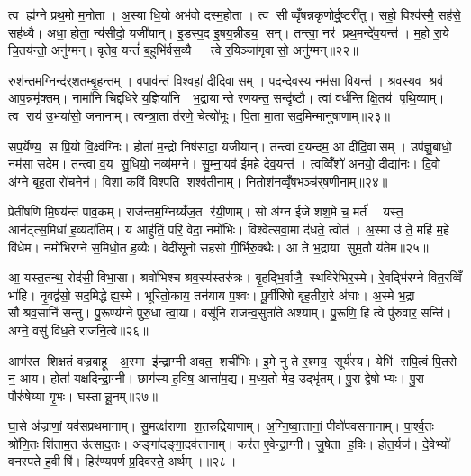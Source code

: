 त्व ह्य॑ग्ने प्रथ॒मो म॒नोता। अ॒स्या धि॒यो अभ॑वो दस्म॒होता। त्व सीव्वृँषन्नकृणोर्दु॒ष्टरी॑तु। सहो॒ विश्व॑स्मै॒ सह॑से॒ सह॑ध्यै। अधा॒ होता॒ न्य॑सीदो॒ यजी॑यान्। इ॒डस्प॒द इ॒षय॒न्नीड्य॒ सन्। तन्त्वा॒ नर॑ प्रथ॒मन्दे॑व॒यन्त॑। म॒हो रा॒ये चि॒तय॑न्तो॒ अनु॑ग्मन्। वृ॒तेव॒ यन्तं॑ ब॒हुभि॑र्वस॒व्यै। त्वे र॒यिञ्जा॑गृ॒वासो॒ अनु॑ग्मन्॥२२॥

रुश॑न्तम॒ग्निन्द॑र्‌श॒तम्बृ॒हन्तम्। व॒पाव॑न्तं वि॒श्वहा॑ दीदि॒वासम्। प॒दन्दे॒वस्य॒ नम॑सा वि॒यन्त॑। श्र॒व॒स्यव॒ श्रव॑ आप॒न्नमृ॑क्तम्। नामा॑नि चिद्दधिरे य॒ज्ञिया॑नि। भ॒द्रायान्ते रणयन्त॒ सन्दृ॑ष्टौ। त्वां व॑र्धन्ति क्षि॒तय॑ पृथि॒व्याम्। त्व राय॑ उ॒भया॑सो॒ जना॑नाम्। त्वन्त्रा॒ता त॑रणे॒ चेत्यो॑भूः। पि॒ता मा॒ता सद॒मिन्मानु॑षाणाम्॥२३॥

सप॒र्येण्य॒ स प्रि॒यो वि॒क्ष्व॑ग्निः। होता॑ म॒न्द्रो निष॑सादा॒ यजी॑यान्। तन्त्वा॑ व॒यन्दम॒ आ दी॑दि॒वासम्। उप॑ज्ञु॒बाधो॒ नम॑सा सदेम। तन्त्वा॑ व॒य सु॒धियो॒ नव्य॑मग्ने। सु॒म्ना॒यव॑ ईमहे देव॒यन्त॑। त्वव्विँशो॑ अनयो॒ दीद्या॑नः। दि॒वो अ॑ग्ने बृह॒ता रो॑च॒नेन॑। वि॒शां क॒विं वि॒श्पति॒ शश्व॑तीनाम्। नि॒तोश॑नव्वृँष॒भञ्च॑र्‌षणी॒नाम्॥२४॥

प्रेती॑षणि मि॒षय॑न्तं पाव॒कम्। राज॑न्तम॒ग्निय्यँ॑ज॒त र॑यी॒णाम्। सो अ॑ग्न ईजे शश॒मे च॒ मर्त॑। यस्त॒ आन॑ट्त्स॒मिधा॑ ह॒व्यदा॑तिम्। य आहु॑तिं॒ परि॒ वेदा॒ नमो॑भिः। विश्वेत्सवा॒मा द॑धते॒ त्वोत॑। अ॒स्मा उ॑ ते॒ महि॑ म॒हे वि॑धेम। नमो॑भिरग्ने स॒मिधो॒त ह॒व्यैः। वेदी॑सूनो सहसो गी॒र्भिरु॒क्थैः। आ ते भ॒द्राया सुम॒तौ य॑तेम॥२५॥

आ॒ यस्त॒तन्थ॒ रोद॑सी॒ विभा॒सा। श्रवो॑भिश्च श्रव॒स्य॑स्तरु॑त्रः। बृ॒हद्भि॒र्वाजै॒ स्थवि॑रेभिर॒स्मे। रे॒वद्भि॑रग्ने वित॒रव्विँ भा॑हि। नृ॒वद्व॑सो॒ सद॒मिद्धेह्य॒स्मे। भूरि॑तो॒काय॒ तन॑याय प॒श्वः। पू॒र्वीरिषो॑ बृह॒तीरा॒रे अ॑घाः। अ॒स्मे भ॒द्रा सौश्रव॒सानि॑ सन्तु। पु॒रूण्य॑ग्ने पुरु॒धा त्वा॒या। वसू॑नि राजन्व॒सुता॑ते अश्याम्। पु॒रूणि॒ हि त्वे पु॑रुवार॒ सन्ति॑। अग्ने॒ वसु॑ विध॒ते राज॑नि॒त्वे॥२६॥\anuvakamend[जा॒गृ॒वासो॒ अनु॑ग्म॒न्मानु॑षाणाञ्चर्‌षणी॒नाय्यँ॑तेमाश्या॒न्द्वे च॑]

आभ॑रत शिक्षतं वज्रबाहू। अ॒स्मा इ॑न्द्राग्नी अवत॒ शची॑भिः। इ॒मे नु ते र॒श्मय॒ सूर्य॑स्य। येभि॑ सपि॒त्वं पि॒तरो॑ न॒ आय\sn{}। होता॑ यक्षदिन्द्रा॒ग्नी। छाग॑स्य ह॒विष॒ आत्ता॑म॒द्य। म॒ध्य॒तो मेद॒ उद्भृ॑तम्। पु॒रा द्वेषोभ्यः। पु॒रा पौरु॑षेय्या गृ॒भः। घस्तान्नू॒नम्॥२७॥

घा॒से अ॑ज्राणां॒ यव॑सप्रथमानाम्। सु॒मत्क्ष॑राणा श॒तरु॑द्रियाणाम्। अ॒ग्नि॒ष्वा॒त्तानां॒ पीवो॑पवसनानाम्। पा॒र्श्व॒तः श्रो॑णि॒तः शि॑ताम॒त उ॑त्साद॒तः। अङ्गा॑दङ्गा॒दव॑त्तानाम्। कर॑त ए॒वेन्द्रा॒ग्नी। जु॒षेता ह॒विः। होत॒र्यज॑। दे॒वेभ्यो॑ वनस्पते ह॒वीषि॑। हिर॑ण्यपर्ण प्र॒दिव॑स्ते॒ अर्थम्।॥२८॥

